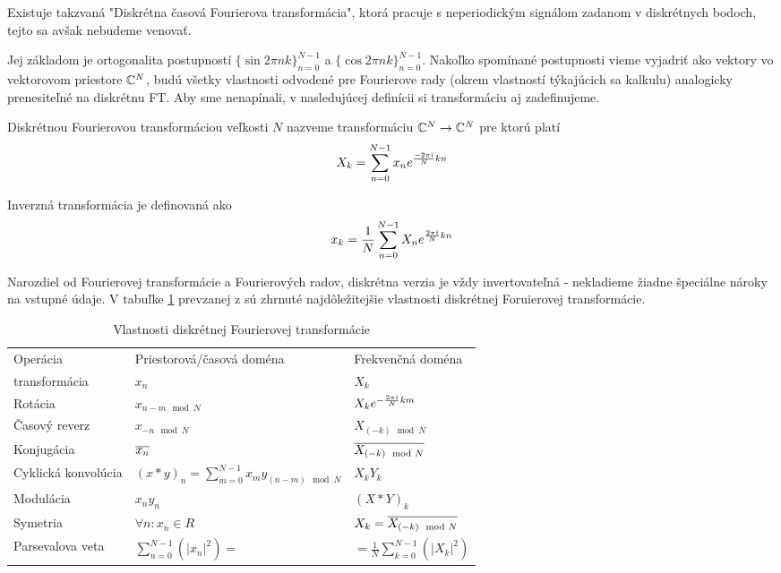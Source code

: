 \begin{poznamka}
    Existuje takzvaná "Diskrétna časová Fourierova transformácia",
    ktorá pracuje s neperiodickým signálom zadanom v diskrétnych
    bodoch, tejto sa avšak nebudeme venovať.
\end{poznamka}

Jej základom je ortogonalita postupností $\{\sin 2\pi n
k\}_{n=0}^{N-1}$ a $\{\cos 2\pi n k\}_{n=0}^{N-1}$. Nakoľko spomínané
postupnosti vieme vyjadriť ako vektory vo vektorovom priestore
$\mathbb{C}^N$, budú všetky vlastnosti odvodené pre Fourierove rady (okrem
vlastností týkajúcich sa kalkulu) analogicky prenesiteľné na diskrétnu
FT. Aby sme nenapínali, v nasledujúcej definícii si transformáciu aj
zadefinujeme.

\begin{definicia}
        Diskrétnou Fourierovou transformáciou veľkosti $N$ nazveme 
        transformáciu $\mathbb{C}^N\rightarrow\mathbb{C}^N$ pre ktorú platí
        \begin{equation}
            X_k = \sum_{n=0}^{N-1} x_n e^{\frac{-2\pi\hat{\imath}}{N} k n}
        \end{equation}
\end{definicia}

Inverzná transformácia je definovaná ako
\begin{equation}
    x_k = \frac{1}{N} \sum_{n=0}^{N-1} X_n e^{\frac{2\pi\hat{\imath}}{N} kn}
\end{equation}

Narozdiel od Fourierovej transformácie a Fourierových radov, diskrétna
verzia je vždy invertovateľná - nekladieme žiadne špeciálne nároky na
vstupné údaje.
V tabuľke \ref{tab:dft_properties} prevzanej z \cite{dft_properties}
sú zhrnuté najdôležitejšie vlastnosti diskrétnej Foruierovej
transformácie.
\begin{table}
    \centering
    \begin{tabular}{lll}
    Operácia&Priestorová/časová doména&Frekvenčná doména\\
    transformácia&$x_n$&$X_k$\\
    Rotácia&$x_{n-m \mod N}$&$X_k e^{-\frac{2 \pi\hat{\imath}}{N} k m}$\\
    Časový reverz&$x_{-n \mod N}$&
        $X_{(-k) \mod N}$\\
    Konjugácia&$\overline{x_n}$&
        $\overline{X_{(-k) \mod N}}$\\
    Cyklická konvolúcia&
        $(x*y)_n= \sum_{m=0}^{N-1} x_m y_{(n-m)\mod N}$&
        $X_k Y_k$\\
    Modulácia&
        $x_n y_n$& $ (X*Y)_k$\\
    Symetria&
        $\forall n:x_n\in R$&
        $X_k = \overline{X_{(-k)\mod N}}$\\
    Parsevalova veta&
        $\sum_{n=0}^{N-1}( |x_n|^2)=$&
        $=\frac{1}{N} \sum_{k=0}^{N-1}(|X_k|^2)$
    \end{tabular}

    \caption{Vlastnosti diskrétnej Fourierovej transformácie}
    \label{tab:dft_properties}

\end{table}
